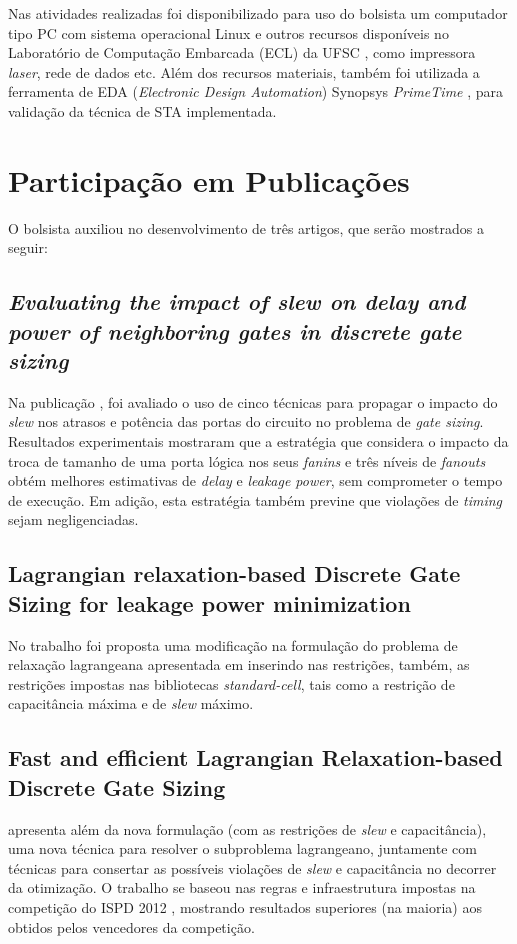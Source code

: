 \documentclass[
	12pt,				%
	openright,			%
	twoside,			%
	a4paper,			%
	english,			%
	french,				%
	spanish,			%
	brazil,				%
	]{abntex2}
\begin{document}
Nas atividades realizadas foi disponibilizado para uso do bolsista um computador tipo PC com sistema operacional Linux e outros recursos disponíveis no Laboratório de Computação Embarcada (ECL) da UFSC \cite{ECL}, como impressora \textit{laser}, rede de dados etc. Além dos recursos materiais, também foi utilizada a ferramenta de EDA (\textit{Electronic Design Automation}) Synopsys \textregistered \textit{PrimeTime} \texttrademark \cite{PrimeTime12}, para validação da técnica de STA implementada.

\section{Participação em Publicações}
\label{sec:publicacoes}

O bolsista auxiliou no desenvolvimento de três artigos, que serão mostrados a seguir:

\subsection{\textit{Evaluating the impact of slew on delay and power of neighboring gates in discrete gate sizing}}

Na publicação \cite{lascas2012}, foi avaliado o uso de cinco técnicas para propagar o impacto do \textit{slew} nos atrasos e potência das portas do circuito no problema de \textit{gate sizing}. Resultados experimentais mostraram que a estratégia que considera o impacto da troca de tamanho de uma porta lógica nos seus \textit{fanins} e três níveis de \textit{fanouts} obtém melhores estimativas de \textit{delay} e \textit{leakage power}, sem comprometer o tempo de execução. Em adição, esta estratégia também previne que violações de \textit{timing} sejam negligenciadas.


\subsection{Lagrangian relaxation-based Discrete Gate Sizing for leakage power minimization}
No trabalho \cite{icecs2012} foi proposta uma modificação na formulação do problema de relaxação lagrangeana apresentada em \cite{ozdal11} inserindo nas restrições, também, as restrições impostas nas bibliotecas \textit{standard-cell}, tais como a restrição de capacitância máxima e de \textit{slew} máximo.

\subsection{Fast and efficient Lagrangian Relaxation-based Discrete Gate Sizing}
\cite{date2013} apresenta além da nova formulação (com as restrições de \textit{slew} e capacitância), uma nova técnica para resolver o subproblema lagrangeano, juntamente com técnicas para consertar as possíveis violações de \textit{slew} e capacitância no decorrer da otimização. O trabalho se baseou nas regras e infraestrutura impostas na competição do ISPD 2012 \cite{ozdal2012ispd}, mostrando resultados superiores (na maioria) aos obtidos pelos vencedores da competição.
\end{document}

